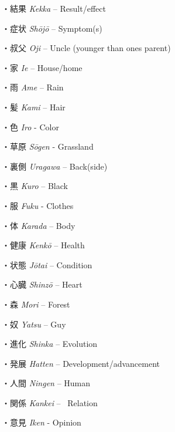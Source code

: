 \par{・結果 \emph{Kekka }– Result\slash effect }

\par{・症状 \emph{Shōjō }– Symptom(s) }

\par{・叔父 \emph{Oji }– Uncle (younger than one\textquotesingle s parent) }

\par{・家 \emph{Ie }– House\slash home }

\par{・雨 \emph{Ame }– Rain }

\par{・髪 \emph{Kami }– Hair }

\par{・色 \emph{Iro }- Color }

\par{・草原 \emph{Sōgen }- Grassland }

\par{・裏側 \emph{Uragawa }– Back(side) }

\par{・黒 \emph{Kuro }– Black }

\par{・服 \emph{Fuku }- Clothes }

\par{・体 \emph{Karada }– Body }

\par{・健康 \emph{Kenkō }– Health }

\par{・状態 \emph{Jōtai }– Condition }

\par{・心臓 \emph{Shinzō }– Heart }

\par{・森 \emph{Mori }– Forest }

\par{・奴 \emph{Yatsu }– Guy }

\par{・進化 \emph{Shinka }– Evolution }

\par{・発展 \emph{Hatten }– Development\slash advancement }

\par{・人間 \emph{Ningen }– Human }

\par{・関係 \emph{Kankei }–  Relation }

\par{・意見 \emph{Iken }- Opinion }

